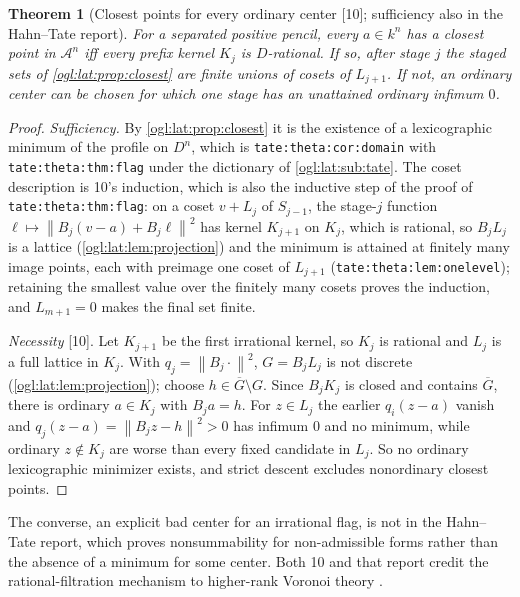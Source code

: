 \documentclass[11pt,oneside]{article}
\numberwithin{equation}{section}
\newtheorem{theorem}{Theorem}[section]
\theoremstyle{definition}
\theoremstyle{remark}
\newcommand{\A}{\mathcal A}
\newcommand{\norm}[1]{\left\lVert #1\right\rVert}
\newcommand{\src}[1]{\textup{\textsf{\small[#1]}}}
\newcommand{\replabel}[1]{\nolinkurl{#1}}
\begin{document}
\begin{theorem}[Closest points for every ordinary center \src{10}; sufficiency also in the Hahn--Tate report]\label{ogl:lat:thm:closestflag}
For a separated positive pencil, every $a\in k^n$ has a closest point in $\A^n$
iff every prefix kernel $K_j$ is $D$-rational. If so, after stage $j$ the staged
sets of \cref{ogl:lat:prop:closest} are finite unions of cosets of $L_{j+1}$. If
not, an ordinary center can be chosen for which one stage has an unattained
ordinary infimum $0$.
\end{theorem}
\begin{proof}
\emph{Sufficiency.} By \cref{ogl:lat:prop:closest} it is the existence of a
lexicographic minimum of the profile on $D^n$, which is
\replabel{tate:theta:cor:domain} with \replabel{tate:theta:thm:flag} under the
dictionary of \cref{ogl:lat:sub:tate}. The coset description is 10's induction,
which is also the inductive step of the proof of \replabel{tate:theta:thm:flag}:
on a coset $v+L_j$ of $S_{j-1}$, the stage-$j$ function
$\ell\mapsto\norm{B_j(v-a)+B_j\ell}^2$ has kernel $K_{j+1}$ on $K_j$, which is
rational, so $B_jL_j$ is a lattice (\cref{ogl:lat:lem:projection}) and the
minimum is attained at finitely many image points, each with preimage one coset
of $L_{j+1}$ (\replabel{tate:theta:lem:onelevel}); retaining the smallest value
over the finitely many cosets proves the induction, and $L_{m+1}=0$ makes the
final set finite.

\emph{Necessity} \src{10}. Let $K_{j+1}$ be the first irrational kernel, so $K_j$
is rational and $L_j$ is a full lattice in $K_j$. With $q_j=\norm{B_j\cdot}^2$,
$G=B_jL_j$ is not discrete (\cref{ogl:lat:lem:projection}); choose
$h\in\overline G\setminus G$. Since $B_jK_j$ is closed and contains $\overline G$,
there is ordinary $a\in K_j$ with $B_ja=h$. For $z\in L_j$ the earlier
$q_i(z-a)$ vanish and $q_j(z-a)=\norm{B_jz-h}^2>0$ has infimum $0$ and no
minimum, while ordinary $z\notin K_j$ are worse than every fixed candidate in
$L_j$. So no ordinary lexicographic minimizer exists, and strict descent
excludes nonordinary closest points.
\end{proof}

The converse, an explicit bad center for an irrational flag, is not in the
Hahn--Tate report, which proves nonsummability for non-admissible forms rather
than the absence of a minimum for some center. Both 10 and that report credit the
rational-filtration mechanism to higher-rank Voronoi theory \cite{AN}.
\end{document}
